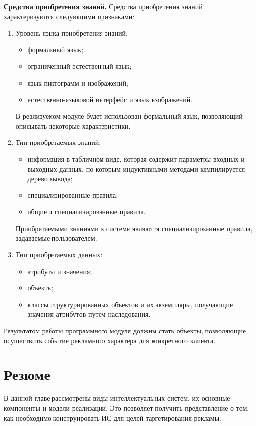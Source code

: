 \textbf{Средства приобретения знаний.} Средства приобретения знаний характеризуются следующими признаками:

\begin{enumerate}
	\item Уровень языка приобретения знаний:
	\begin{itemize}
		\item формальный язык;
		\item ограниченный естественный язык;
		\item язык пиктограмм и изображений;
		\item естественно-языковой интерфейс и язык изображений. 
	\end{itemize}

	В реализуемом модуле будет использован формальный язык, позволяющий описывать некоторые характеристики.

	\item Тип приобретаемых знаний:
	\begin{itemize}
		\item информация в табличном виде, которая содержит параметры входных и выходных данных, по которым индуктивными методами компилируется дерево вывода;
		\item специализированные правила;
		\item общие и специализированные правила.
	\end{itemize}

	Приобретаемыми знаниями в системе являются специализированные правила, задаваемые пользователем.

	\item Тип приобретаемых данных:
	\begin{itemize}
		\item атрибуты и значения;
		\item объекты;
		\item классы структурированных объектов и их экземпляры, получающие значения атрибутов путем наследования.  
	\end{itemize}

\end{enumerate}

Результатом работы программного модуля должны стать объекты, позволяющие осуществить событие рекламного характера для конкретного клиента.

\section{Резюме}

В данной главе рассмотрены виды интеллектуальных систем, их основные компоненты и модели реализации. Это позволяет получить представление о том, как необходимо конструировать ИС для целей таргетирования рекламы.